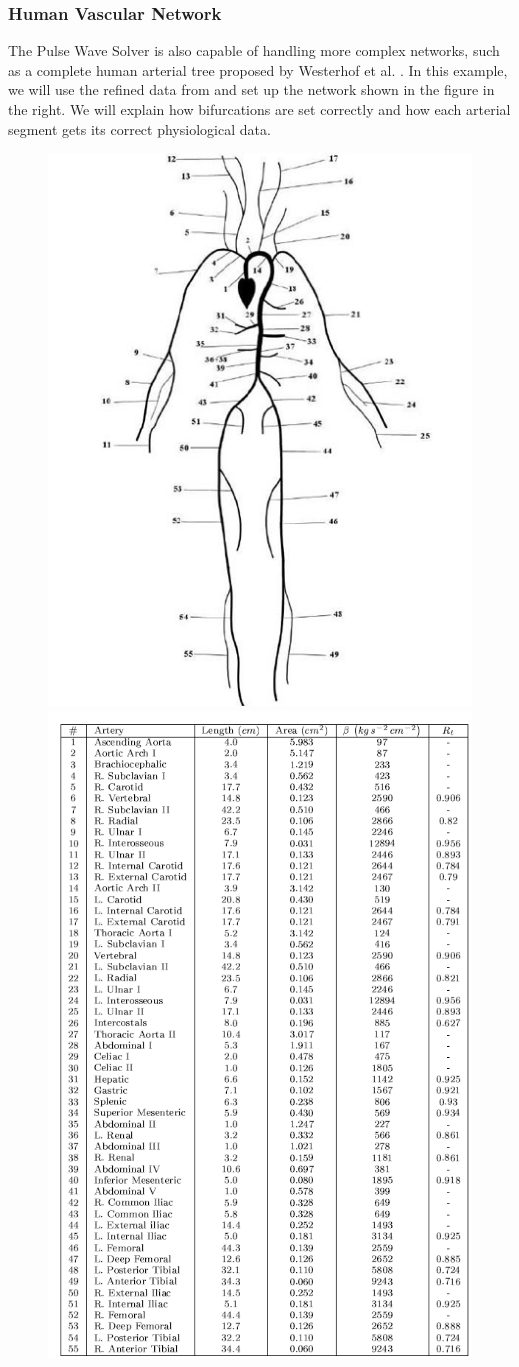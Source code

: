 \subsubsection{Human Vascular Network}
The Pulse Wave Solver is also capable of handling more complex networks, such as
a complete human arterial tree proposed by Westerhof et al. \cite{We69}.
In this example, we will use the refined data from \cite{ShFoPeFr03} and set up
the network shown in the figure in the right. We will explain how bifurcations
are set correctly and how each arterial segment gets its correct physiological
data.

\begin{figure}
	\includegraphics[width=0.49\linewidth]{img/55_artery_network.jpg}
	\includegraphics[width=0.49\linewidth]{img/Data_Table.png}
\end{figure}

